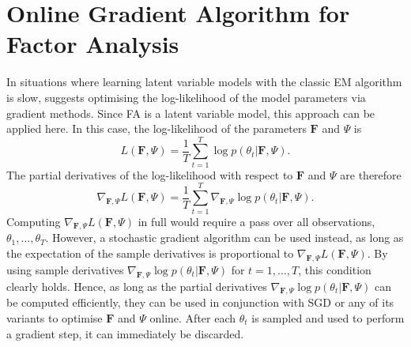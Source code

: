 \documentclass[msc,deptreport.inf]{infthesis} %
\newcommand{\matr}[1]{\mathbf{#1}}
\begin{document}
\section{Online Gradient Algorithm for Factor Analysis}\label{sec:gradient_fa}

In situations where learning latent variable models with the classic EM algorithm is slow, \cite{barber2007} suggests optimising the log-likelihood of the model parameters via gradient methods. Since FA is a latent variable model, this approach can be applied here. In this case, the log-likelihood of the parameters $\matr{F}$ and $\Psi$ is 
\begin{equation}
	L(\matr{F}, \Psi) = \frac{1}{T} \sum_{t=1}^T \log p(\theta_t | \matr{F}, \Psi).
\end{equation}
The partial derivatives of the log-likelihood with respect to $\matr{F}$ and $\Psi$ are therefore
\begin{equation}
	\nabla_{\matr{F}, \Psi} L(\matr{F}, \Psi) = \frac{1}{T} \sum_{t=1}^T \nabla_{\matr{F}, \Psi} \log p(\theta_t | \matr{F}, \Psi).
\end{equation}
Computing $\nabla_{\matr{F}, \Psi} L(\matr{F}, \Psi)$ in full would require a pass over all observations, $\theta_1, \dots, \theta_T$. However, a stochastic gradient algorithm can be used instead, as long as the expectation of the sample derivatives is proportional to $\nabla_{\matr{F}, \Psi} L(\matr{F}, \Psi)$. By using sample derivatives $\nabla_{\matr{F}, \Psi} \log p(\theta_t | \matr{F}, \Psi)$ for $t=1,\dots,T$, this condition clearly holds. Hence, as long as the partial derivatives $\nabla_{\matr{F}, \Psi} \log p(\theta_t | \matr{F}, \Psi)$ can be computed efficiently, they can be used in conjunction with SGD or any of its variants to optimise $\matr{F}$ and $\Psi$ online. After each $\theta_t$ is sampled and used to perform a gradient step, it can immediately be discarded. 
\end{document}
